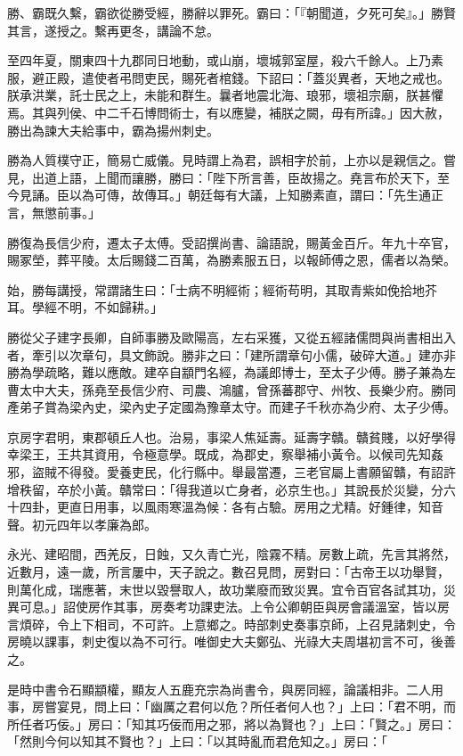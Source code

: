 \begin{pinyinscope}
勝、霸既久繫，霸欲從勝受經，勝辭以罪死。霸曰：「『朝聞道，夕死可矣』。」勝賢其言，遂授之。繫再更冬，講論不怠。

至四年夏，關東四十九郡同日地動，或山崩，壞城郭室屋，殺六千餘人。上乃素服，避正殿，遣使者弔問吏民，賜死者棺錢。下詔曰：「蓋災異者，天地之戒也。朕承洪業，託士民之上，未能和群生。曩者地震北海、琅邪，壞祖宗廟，朕甚懼焉。其與列侯、中二千石博問術士，有以應變，補朕之闕，毋有所諱。」因大赦，勝出為諫大夫給事中，霸為揚州刺史。

勝為人質樸守正，簡易亡威儀。見時謂上為君，誤相字於前，上亦以是親信之。嘗見，出道上語，上聞而讓勝，勝曰：「陛下所言善，臣故揚之。堯言布於天下，至今見誦。臣以為可傳，故傳耳。」朝廷每有大議，上知勝素直，謂曰：「先生通正言，無懲前事。」

勝復為長信少府，遷太子太傅。受詔撰尚書、論語說，賜黃金百斤。年九十卒官，賜冢塋，葬平陵。太后賜錢二百萬，為勝素服五日，以報師傅之恩，儒者以為榮。

始，勝每講授，常謂諸生曰：「士病不明經術；經術苟明，其取青紫如俛拾地芥耳。學經不明，不如歸耕。」

勝從父子建字長卿，自師事勝及歐陽高，左右采獲，又從五經諸儒問與尚書相出入者，牽引以次章句，具文飾說。勝非之曰：「建所謂章句小儒，破碎大道。」建亦非勝為學疏略，難以應敵。建卒自顓門名經，為議郎博士，至太子少傅。勝子兼為左曹太中大夫，孫堯至長信少府、司農、鴻臚，曾孫蕃郡守、州牧、長樂少府。勝同產弟子賞為梁內史，梁內史子定國為豫章太守。而建子千秋亦為少府、太子少傅。

京房字君明，東郡頓丘人也。治易，事梁人焦延壽。延壽字贛。贛貧賤，以好學得幸梁王，王共其資用，令極意學。既成，為郡史，察舉補小黃令。以候司先知姦邪，盜賊不得發。愛養吏民，化行縣中。舉最當遷，三老官屬上書願留贛，有詔許增秩留，卒於小黃。贛常曰：「得我道以亡身者，必京生也。」其說長於災變，分六十四卦，更直日用事，以風雨寒溫為候：各有占驗。房用之尤精。好鍾律，知音聲。初元四年以孝廉為郎。

永光、建昭間，西羌反，日蝕，又久青亡光，陰霧不精。房數上疏，先言其將然，近數月，遠一歲，所言屢中，天子說之。數召見問，房對曰：「古帝王以功舉賢，則萬化成，瑞應著，末世以毀譽取人，故功業廢而致災異。宜令百官各試其功，災異可息。」詔使房作其事，房奏考功課吏法。上令公卿朝臣與房會議溫室，皆以房言煩碎，令上下相司，不可許。上意鄉之。時部刺史奏事京師，上召見諸刺史，令房曉以課事，刺史復以為不可行。唯御史大夫鄭弘、光祿大夫周堪初言不可，後善之。

是時中書令石顯顓權，顯友人五鹿充宗為尚書令，與房同經，論議相非。二人用事，房嘗宴見，問上曰：「幽厲之君何以危？所任者何人也？」上曰：「君不明，而所任者巧佞。」房曰：「知其巧佞而用之邪，將以為賢也？」上曰：「賢之。」房曰：「然則今何以知其不賢也？」上曰：「以其時亂而君危知之。」房曰：「


\end{pinyinscope}

